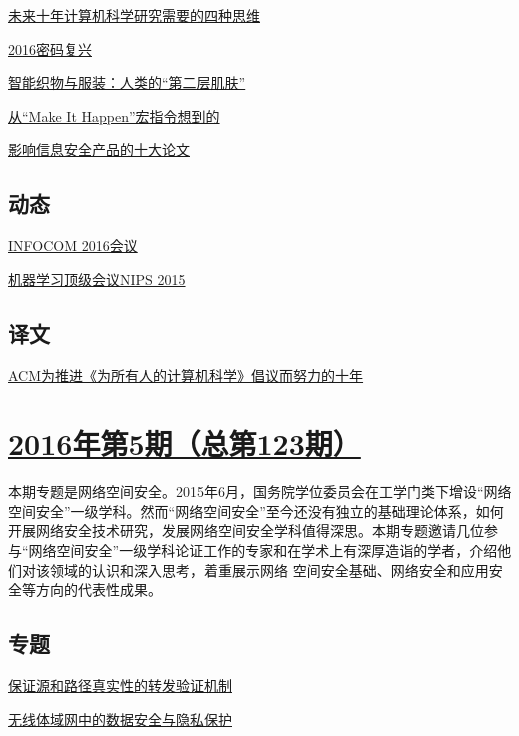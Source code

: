 \documentclass[a4paper]{article}
\begin{document}
\href{http://history.ccf.org.cn/resources/1190201776262/2016/06/13/6.pdf}{未来十年计算机科学研究需要的四种思维}

\href{http://history.ccf.org.cn/resources/1190201776262/2016/06/13/7.pdf}{2016密码复兴}

\href{http://history.ccf.org.cn/resources/1190201776262/2016/06/13/11.pdf}{智能织物与服装：人类的“第二层肌肤”}

\href{http://history.ccf.org.cn/resources/1190201776262/2016/06/13/10.pdf}{从“Make It Happen”宏指令想到的}

\href{http://history.ccf.org.cn/resources/1190201776262/2016/06/13/8.pdf}{影响信息安全产品的十大论文}

\subsection{动态}
\href{http://history.ccf.org.cn/resources/1190201776262/2016/06/13/14.pdf}{INFOCOM 2016会议}

\href{http://history.ccf.org.cn/resources/1190201776262/2016/06/13/15.pdf}{机器学习顶级会议NIPS 2015}

\subsection{译文}
\href{http://history.ccf.org.cn/resources/1190201776262/2016/06/13/16.pdf}{ACM为推进《为所有人的计算机科学》倡议而努力的十年}


\section{\href{http://history.ccf.org.cn/sites/ccf/jsjtbbd.jsp?contentId=2926004897743}{\textbf{2016年第5期（总第123期）}}}
本期专题是网络空间安全。2015年6月，国务院学位委员会在工学门类下增设“网络空间安全”一级学科。然而“网络空间安全”至今还没有独立的基础理论体系，如何开展网络安全技术研究，发展网络空间安全学科值得深思。本期专题邀请几位参与“网络空间安全”一级学科论证工作的专家和在学术上有深厚造诣的学者，介绍他们对该领域的认识和深入思考，着重展示网络
空间安全基础、网络安全和应用安全等方向的代表性成果。
\subsection{专题}
\href{http://history.ccf.org.cn/resources/1190201776262/2016/05/12/3.pdf}{保证源和路径真实性的转发验证机制}

\href{http://history.ccf.org.cn/resources/1190201776262/2016/05/12/5.pdf}{无线体域网中的数据安全与隐私保护}
\end{document}
